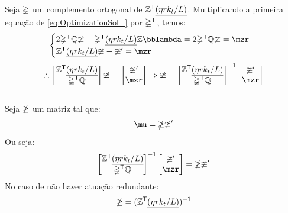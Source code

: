 \documentclass[a4paper,11pt,brazil,fleqn]{article}
\begin{document}
Seja $\mathbb{\Psi}$ um complemento ortogonal de $\mathbb{Z}^{\mathsf{T}}  \underline{(\eta r k_t / L)}$. Multiplicando a primeira equa\c{c}\~ao de \eqref{eq:OptimizationSol_} por $\mathbb{\Psi}^{\mathsf{T}}$, temos:
\begin{equation} \label{eq:OptimizationSol_2}
\begin{cases}
2 \mPsi^\msT \mQ \mup + \mPsi^\msT \underline{(\eta r k_t / L)} \mZ \mlambda = 2 \mPsi^\msT \mQ \mup = \mzr \\
\mZ^\msT  \underline{(\eta r k_t / L)} \mup - \mup' = \mzr
\end{cases}
\end{equation}
\begin{equation} \label{eq:OptimizationSol_3}
\therefore
\begin{bmatrix}
\mZ^\msT  \underline{(\eta r k_t / L)} \\
\mPsi^\msT \mQ
\end{bmatrix}
\mup = 
\begin{bmatrix}
\mup' \\
\mzr
\end{bmatrix}
\Rightarrow
\mup =
\begin{bmatrix}
\mZ^\msT  \underline{(\eta r k_t / L)} \\
\mPsi^\msT \mQ
\end{bmatrix}^\msI
\begin{bmatrix}
\mup' \\
\mzr
\end{bmatrix}
\end{equation} \\

Seja $\mathbb{\Lambda}$ um matriz tal que:
\begin{equation} \label{eq:mupexplicito}
\mu = \mLambda \mup'
\end{equation}
Ou seja:
\begin{equation}
\begin{bmatrix}
\mZ^\msT  \underline{(\eta r k_t / L)} \\
\mPsi^\msT \mQ
\end{bmatrix}^\msI
\begin{bmatrix}
\mup' \\
\mzr
\end{bmatrix}
= \mLambda \mup'
\end{equation}
No caso de n\~ao haver atua\c{c}\~ao redundante:
\begin{equation}
\mathbb{\Lambda} = ( \mathbb{Z}^{\mathsf{T}}  \underline{(\eta r k_t / L)} )^{\mathsf{-1}}
\end{equation}
\end{document}
